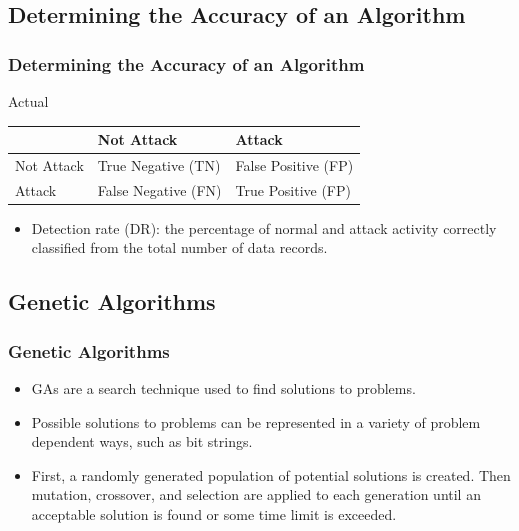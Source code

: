 \documentclass{beamer}
\newcommand{\linespace}{\vskip 0.25cm}
\begin{document}
\subsection{Determining the Accuracy of an Algorithm}
\begin{frame}
  \frametitle{Determining the Accuracy of an Algorithm}
\begin{table}
Actual
\begin{tabular}{l|ll}
 & Not Attack & Attack \\ \hline
Not Attack & True Negative (TN) & False Positive (FP) \\
Attack & False Negative (FN) & True Positive (FP)  \\
\end{tabular}
\end{table}
\linespace
	\begin{itemize}
		\item Detection rate (DR): the percentage of normal and attack activity correctly classified from the total number of data records.
	\end{itemize}
\end{frame}



\subsection{Genetic Algorithms}
\begin{frame}
  \frametitle{Genetic Algorithms}
	\begin{itemize}
		\item GAs are a search technique used to find solutions to problems.
        \item Possible solutions to problems can be represented in a variety of problem dependent ways, such as bit strings.
        \item First, a randomly generated population of potential solutions is created. Then mutation, crossover, and selection are applied to each generation until an acceptable solution is found or some time limit is exceeded.
	\end{itemize}
\end{frame}
\end{document}
